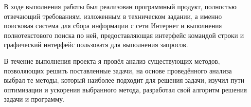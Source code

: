 \Conclusion

В ходе выполнения работы был реализован программный продукт, полностью отвечающий требованиям, изложенным в техническом задании, а именно поисковая система для сбора информации с сети Интернет и выполнения полнотекстового поиска по ней, предоставляющая интерфейс командой строки и графический интерфейс пользоватя для выполнения запросов.

В течение выполнения проекта я провёл анализ существующих методов, позволяющих решить поставленные задачи, на основе проведённого анализа выбрал те методы, который наиболее подходит для решения задачи, изучил пути оптимизации и ускорения выбранного метода, разработал свой алгоритм решения задачи и программу.

